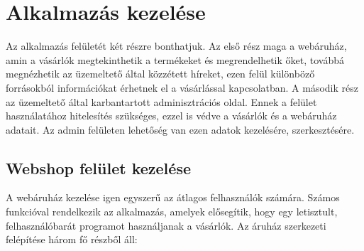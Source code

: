 \section{Alkalmazás kezelése}
Az alkalmazás felületét két részre bonthatjuk. Az első rész maga a webáruház, amin a vásárlók megtekinthetik a termékeket és megrendelhetik őket, továbbá megnézhetik az üzemeltető által közzétett híreket, ezen felül különböző forrásokból információkat érhetnek el a vásárlással kapcsolatban. A második rész az üzemeltető által karbantartott adminisztrációs oldal. Ennek a felület használatához hitelesítés szükséges, ezzel is védve a vásárlók és a webáruház adatait. Az admin felületen lehetőség van ezen adatok kezelésére, szerkesztésére. 

\subsection{Webshop felület kezelése}
A webáruház kezelése igen egyszerű az átlagos felhasználók számára. Számos funkcióval rendelkezik az alkalmazás, amelyek elősegítik, hogy egy letisztult, felhasználóbarát programot használjanak a vásárlók.
Az áruház szerkezeti felépítése három fő részből áll:
